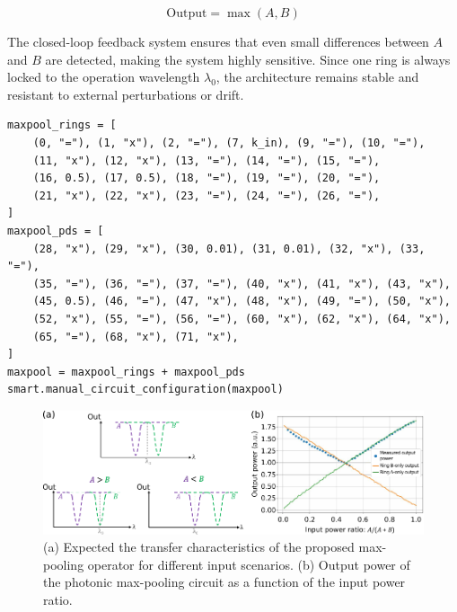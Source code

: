 \begin{equation}
	\text{Output} = \max(A, B)
	\label{eq:ch3-maxpool}
\end{equation}

The closed-loop feedback system ensures that even small differences between \(A\) and \(B\) are detected, making the system highly sensitive.
Since one ring is always locked to the operation wavelength \(λ_0\), the architecture remains stable and resistant to external perturbations or drift.

\begin{lstlisting}[caption={Impementation of an optical max pooling architecture using the first-generation Smartlight API.}, label=lst:ch3-maxpool-circuit]
maxpool_rings = [
    (0, "="), (1, "x"), (2, "="), (7, k_in), (9, "="), (10, "="),
    (11, "x"), (12, "x"), (13, "="), (14, "="), (15, "="),
    (16, 0.5), (17, 0.5), (18, "="), (19, "="), (20, "="),
    (21, "x"), (22, "x"), (23, "="), (24, "="), (26, "="),
]
maxpool_pds = [
    (28, "x"), (29, "x"), (30, 0.01), (31, 0.01), (32, "x"), (33, "="),
    (35, "="), (36, "="), (37, "="), (40, "x"), (41, "x"), (43, "x"),
    (45, 0.5), (46, "="), (47, "x"), (48, "x"), (49, "="), (50, "x"),
    (52, "x"), (55, "="), (56, "="), (60, "x"), (62, "x"), (64, "x"),
    (65, "="), (68, "x"), (71, "x"),
]
maxpool = maxpool_rings + maxpool_pds
smart.manual_circuit_configuration(maxpool)
\end{lstlisting}

\begin{figure}[b!]
	\begin{center}
		\includegraphics{figures/ch3-maxpool-power_meter.pdf}
	\end{center}
	\caption{
		(a) Expected the transfer characteristics of the proposed max-pooling operator for different input scenarios.
		(b) Output power of the photonic max-pooling circuit as a function of the input power ratio.}\label{fig:ch3-maxpool-power_meter}
\end{figure}

